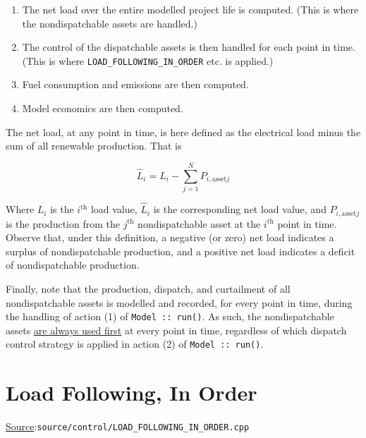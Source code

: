 \documentclass[12pt, letterpaper]{report}
\begin{document}
\begin{enumerate}
    \item The net load over the entire modelled project life is computed. (This is where the nondispatchable assets are handled.)
    \item The control of the dispatchable assets is then handled for each point in time. (This is where \texttt{LOAD\_FOLLOWING\_IN\_ORDER} etc. is applied.)
    \item Fuel consumption and emissions are then computed.
    \item Model economics are then computed.
\end{enumerate}

The net load, at any point in time, is here defined as the electrical load minus the sum of all renewable production. That is

\begin{equation}
    \widehat{L}_i = L_i - \sum_{j=1}^N P_{i,\textrm{asset} j}
    \label{eqn:net_load}
\end{equation}

\noindent Where $L_i$ is the $i^\textrm{th}$ load value, $\widehat{L}_i$ is the corresponding net load value, and $P_{i,\textrm{asset} j}$ is the production from the $j^\textrm{th}$ nondispatchable asset at the $i^\textrm{th}$ point in time. Observe that, under this definition, a negative (or zero) net load indicates a surplus of nondispatchable production, and a positive net load indicates a deficit of nondispatchable production.\par 
Finally, note that the production, dispatch, and curtailment of all nondispatchable assets is modelled and recorded, for every point in time, during the handling of action (1) of \texttt{Model :: run()}. As such, the nondispatchable assets \underline{are always used first} at every point in time, regardless of which dispatch control strategy is applied in action (2) of \texttt{Model :: run()}.

\section{Load Following, In Order}

\begin{large}
\noindent\underline{Source}:\quad\texttt{source/control/LOAD\_FOLLOWING\_IN\_ORDER.cpp}\par
\end{large}
\vspace{5mm}
\end{document}
